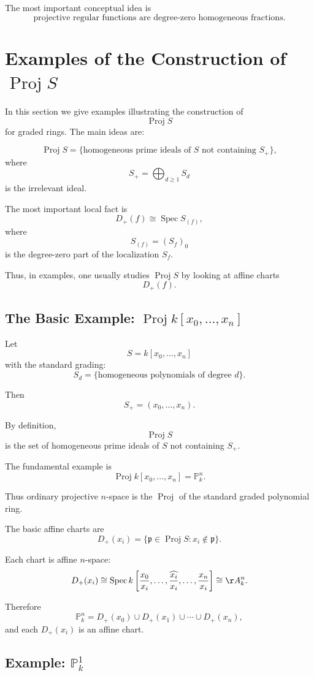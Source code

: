\documentclass[12pt,a4paper]{article}
\DeclareMathOperator{\Spec}{Spec}
\DeclareMathOperator{\Proj}{Proj}
\newcommand{\PP}{\mathbb P}
\theoremstyle{notespace}
\begin{document}
The most important conceptual idea is
\[
\boxed{
	\text{projective regular functions are degree-zero homogeneous fractions.}
}
\]

\section{Examples of the Construction of \texorpdfstring{$\Proj S$}{Proj S}}

In this section we give examples illustrating the construction of
\[
\Proj S
\]
for graded rings. The main ideas are:

\[
\Proj S
=
\{\text{homogeneous prime ideals of }S\text{ not containing }S_+\},
\]
where
\[
S_+=\bigoplus_{d\ge 1}S_d
\]
is the irrelevant ideal.

The most important local fact is
\[
D_+(f)\cong \Spec S_{(f)},
\]
where
\[
S_{(f)}=(S_f)_0
\]
is the degree-zero part of the localization \(S_f\).

Thus, in examples, one usually studies \(\Proj S\) by looking at affine charts
\[
D_+(f).
\]

\subsection{The Basic Example: \texorpdfstring{$\Proj k[x_0,\dots,x_n]$}{Proj k[x0,...,xn]}}

Let
\[
S=k[x_0,\dots,x_n]
\]
with the standard grading:
\[
S_d=\{\text{homogeneous polynomials of degree }d\}.
\]

Then
\[
S_+=(x_0,\dots,x_n).
\]

By definition,
\[
\Proj S
\]
is the set of homogeneous prime ideals of \(S\) not containing \(S_+\).

The fundamental example is
\[
\boxed{
	\Proj k[x_0,\dots,x_n]=\PP_k^n.
}
\]

Thus ordinary projective \(n\)-space is the \(\Proj\) of the standard graded polynomial ring.

The basic affine charts are
\[
D_+(x_i)
=
\{\mathfrak p\in \Proj S:x_i\notin\mathfrak p\}.
\]

Each chart is affine \(n\)-space:
\[
D_+(x_i)
\cong
\Spec k\left[
\frac{x_0}{x_i},
\dots,
\widehat{\frac{x_i}{x_i}},
\dots,
\frac{x_n}{x_i}
\right]
\cong
\AA_k^n.
\]

Therefore
\[
\PP_k^n
=
D_+(x_0)\cup D_+(x_1)\cup\cdots\cup D_+(x_n),
\]
and each \(D_+(x_i)\) is an affine chart.

\subsection{Example: \texorpdfstring{$\PP_k^1$}{P1}}
\end{document}
